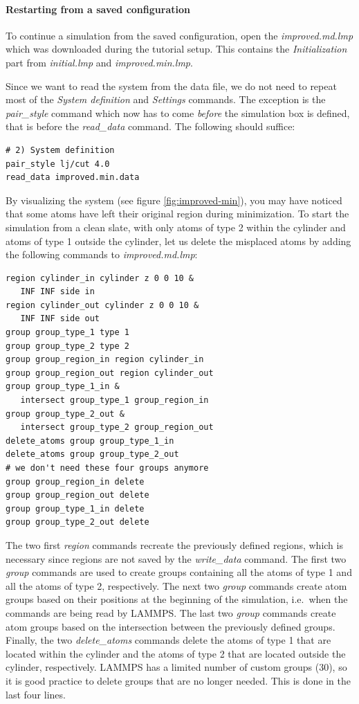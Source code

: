 \documentclass[9pt,tutorial]{livecoms}
\begin{document}
\paragraph{Restarting from a saved configuration}

To continue a simulation from the saved configuration, open the
\textit{improved.md.lmp} which was downloaded during the tutorial setup.
This contains the \textit{Initialization} part from \textit{initial.lmp}
and \textit{improved.min.lmp}.

Since we want to read the system from the data file, we do not need
to repeat most of the \textit{System definition} and \textit{Settings}
commands.  The exception is the \textit{pair\_style} command which now
has to come \emph{before} the simulation box is defined, that is before
the \textit{read\_data} command.  The following should suffice:
{\normalsize
\begin{verbatim}
# 2) System definition
pair_style lj/cut 4.0
read_data improved.min.data
\end{verbatim}
}

By visualizing the system (see figure \ref{fig:improved-min}), you may
have noticed that some atoms have left their original region during
minimization.  To start the simulation from a clean slate, with only
atoms of type 2 within the cylinder and atoms of type 1 outside the
cylinder, let us delete the misplaced atoms by adding the following
commands to \textit{improved.md.lmp}:

{\normalsize
\begin{verbatim}
region cylinder_in cylinder z 0 0 10 &
   INF INF side in
region cylinder_out cylinder z 0 0 10 &
   INF INF side out
group group_type_1 type 1
group group_type_2 type 2
group group_region_in region cylinder_in
group group_region_out region cylinder_out
group group_type_1_in &
   intersect group_type_1 group_region_in
group group_type_2_out &
   intersect group_type_2 group_region_out
delete_atoms group group_type_1_in
delete_atoms group group_type_2_out
# we don't need these four groups anymore
group group_region_in delete
group group_region_out delete
group group_type_1_in delete
group group_type_2_out delete
\end{verbatim}
}

The two first \textit{region} commands recreate the previously defined
regions, which is necessary since regions are not saved by the
\textit{write\_data} command.  The first two \textit{group} commands are
used to create groups containing all the atoms of type 1 and all the
atoms of type 2, respectively.  The next two \textit{group} commands
create atom groups based on their positions at the beginning of the
simulation, i.e.~when the commands are being read by LAMMPS.  The last
two \textit{group} commands create atom groups based on the intersection
between the previously defined groups.  Finally, the two
\textit{delete\_atoms} commands delete the atoms of type 1 that are
located within the cylinder and the atoms of type 2 that are located
outside the cylinder, respectively.  LAMMPS has a limited number of
custom groups (30), so it is good practice to delete groups that are no
longer needed.  This is done in the last four lines.
\end{document}
